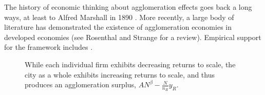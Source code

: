 The history of economic thinking about agglomeration effects goes back a long ways, at least to  Alfred Marshall in 1890 \cite{marshallPrinciplesEconomics1890}. %
More recently, a large body of literature has demonstrated the existence of agglomeration economies in developed economies (see Rosenthal and Strange \cite{rosenthalEvidenceNatureSources2004} for a review). Empirical support for the framework includes \cite{spenceUrbanizationGrowth2009, durantonAreCitiesEngines2009, durantonHumanCapitalExternalities2006}. 

\begin{figure}[htb]
    \centering

    \caption[Increasing returns to scale for cities and decreasing returns for firms]{While each individual firm exhibits decreasing returns to scale, the city as a whole exhibits increasing returns to scale, and thus produces an agglomeration surplus, $AN^\beta-\frac{N}{n_R}y_R$.}
    \label{fig-agglomeration-surplus} %
\end{figure}
 
